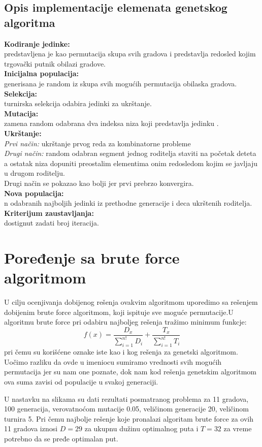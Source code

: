 \documentclass[a4paper]{article}
\begin{document}
\subsection{Opis implementacije elemenata genetskog algoritma}
\textbf{Kodiranje jedinke:}\\ predstavljena je kao permutacija skupa svih gradova i predstavlja redosled kojim trgovački putnik obilazi gradove.\\
\textbf{Inicijalna populacija:}\\ generisana je random iz skupa svih mogućih permutacija obilaska gradova. \\
\textbf{Selekcija:}\\
turnirska selekcija odabira jedinki za ukrštanje.\\
\textbf{Mutacija:} \\zamena random odabrana dva indeksa niza koji predstavlja jedinku \cite{1}.\\
\textbf{Ukrštanje:}\\ 
\textit{Prvi način:} ukrštanje prvog reda za kombinatorne probleme\\
\textit{Drugi način:} random odabran segment jednog roditelja staviti na početak deteta a ostatak niza dopuniti preostalim elementima onim redosledom kojim se javljaju u drugom roditelju. \\
Drugi način se pokazao kao bolji jer prvi prebrzo konvergira.\\
\textbf{Nova populacija:} \\n odabranih najboljih jedinki iz prethodne generacije i deca ukrštenih roditelja.
\textbf{Kriterijum zaustavljanja:}\\ dostignut zadati broj iteracija.

\section{Poređenje sa brute force algoritmom}
U cilju ocenjivanja dobijenog rešenja ovakvim algoritmom uporedimo sa rešenjem dobijenim brute force algoritmom, koji ispituje sve moguće permutacije.U algoritmu brute force pri odabiru najboljeg rešenja tražimo minimum funkcje:
$$ f(x)=\frac{D_x}{\sum_{i=1}^{n!} D_i} + \frac{T_x}{\sum_{i=1}^{n!} T_i}$$
pri čemu su korišćene oznake iste kao i kog rešenja za genetski algoritmom. Uočimo razliku da ovde u imeniocu sumiramo vrednosti svih mogućih permutacija jer su nam one poznate, dok nam kod rešenja genetskim algoritmom ova suma zavisi od populacije u svakoj generaciji.\par
U nastavku na slikama su dati rezultati posmatranog problema za 11 gradova, 100 generacija, verovatnoćom mutacije 0.05, veličinom generacije 20, veličinom turnira 5. Pri čemu najbolje rešenje koje pronalazi algoritam brute force za ovih 11 gradova iznosi $D=29$ za ukupnu dužinu optimalnog puta i $T=32$ za vreme potrebno da se pređe optimalan put.
\end{document}
